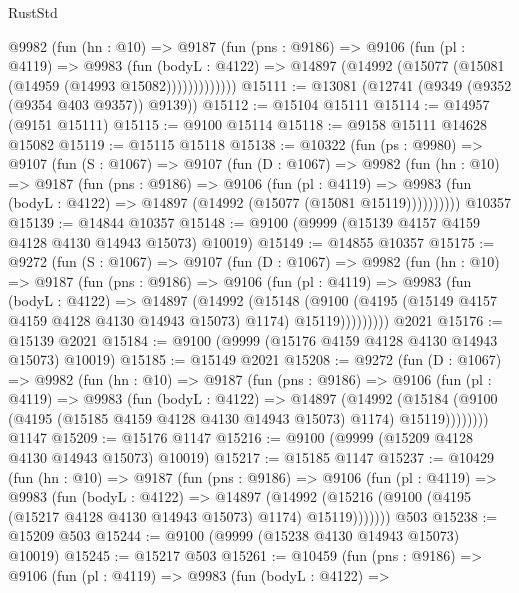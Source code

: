 \begin{lexlean}{RustStd}
\begin{coremodule}
          @9982
            (fun (hn : @10) =>
            @9187
              (fun (pns : @9186) =>
              @9106
                (fun (pl : @4119) =>
                @9983
                  (fun (bodyL : @4122) =>
                  @14897 (@14992 (@15077 (@15081 (@14959 (@14993 @15082)))))))))))))
@15111 := @13081 (@12741 (@9349 (@9352 (@9354 @403 @9357)) @9139))
@15112 := @15104 @15111
@15114 := @14957 (@9151 @15111)
@15115 := @9100 @15114
@15118 := @9158 @15111 @14628 @15082
@15119 := @15115 @15118
@15138 := @10322
    (fun (ps : @9980) =>
    @9107
      (fun (S : @1067) =>
      @9107
        (fun (D : @1067) =>
        @9982
          (fun (hn : @10) =>
          @9187
            (fun (pns : @9186) =>
            @9106
              (fun (pl : @4119) =>
              @9983 (fun (bodyL : @4122) => @14897 (@14992 (@15077 (@15081 @15119))))))))))
    @10357
@15139 := @14844 @10357
@15148 := @9100 (@9999 (@15139 @4157 @4159 @4128 @4130 @14943 @15073) @10019)
@15149 := @14855 @10357
@15175 := @9272
    (fun (S : @1067) =>
    @9107
      (fun (D : @1067) =>
      @9982
        (fun (hn : @10) =>
        @9187
          (fun (pns : @9186) =>
          @9106
            (fun (pl : @4119) =>
            @9983
              (fun (bodyL : @4122) =>
              @14897
                (@14992
                  (@15148
                    (@9100
                      (@4195 (@15149 @4157 @4159 @4128 @4130 @14943 @15073) @1174)
                      @15119)))))))))
    @2021
@15176 := @15139 @2021
@15184 := @9100 (@9999 (@15176 @4159 @4128 @4130 @14943 @15073) @10019)
@15185 := @15149 @2021
@15208 := @9272
    (fun (D : @1067) =>
    @9982
      (fun (hn : @10) =>
      @9187
        (fun (pns : @9186) =>
        @9106
          (fun (pl : @4119) =>
          @9983
            (fun (bodyL : @4122) =>
            @14897
              (@14992
                (@15184 (@9100 (@4195 (@15185 @4159 @4128 @4130 @14943 @15073) @1174) @15119))))))))
    @1147
@15209 := @15176 @1147
@15216 := @9100 (@9999 (@15209 @4128 @4130 @14943 @15073) @10019)
@15217 := @15185 @1147
@15237 := @10429
    (fun (hn : @10) =>
    @9187
      (fun (pns : @9186) =>
      @9106
        (fun (pl : @4119) =>
        @9983
          (fun (bodyL : @4122) =>
          @14897
            (@14992 (@15216 (@9100 (@4195 (@15217 @4128 @4130 @14943 @15073) @1174) @15119)))))))
    @503
@15238 := @15209 @503
@15244 := @9100 (@9999 (@15238 @4130 @14943 @15073) @10019)
@15245 := @15217 @503
@15261 := @10459
    (fun (pns : @9186) =>
    @9106
      (fun (pl : @4119) =>
      @9983
        (fun (bodyL : @4122) =>

\end{coremodule}
\end{lexlean}

